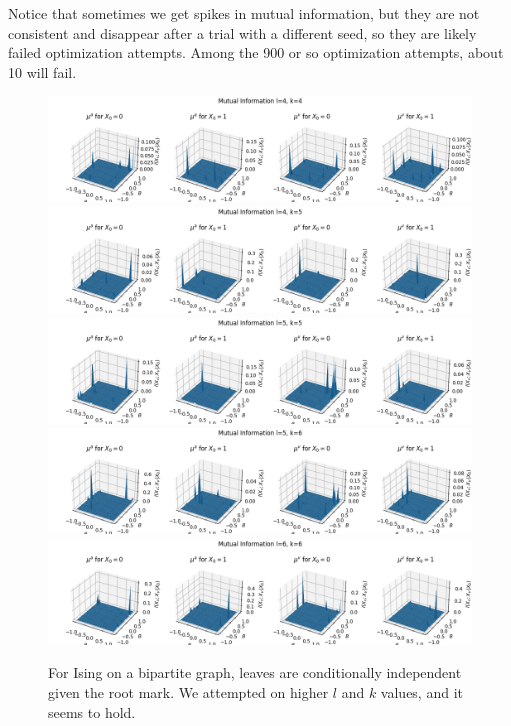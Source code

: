 \documentclass[12pt]{article}
\numberwithin{equation}{section}
\begin{document}
Notice that sometimes we get spikes in mutual information, but they are not
consistent and disappear after a trial with a different seed, so they are likely failed optimization attempts.
Among the 900 or so optimization attempts, about 10 will fail.

\begin{figure}[!h]
    \centering
    \includegraphics[width=16cm]{img/Ising_bptt/CI_l4_k4.png}
    \includegraphics[width=16cm]{img/Ising_bptt/CI_l4_k5.png}
    \includegraphics[width=16cm]{img/Ising_bptt/CI_l5_k5.png}
    \includegraphics[width=16cm]{img/Ising_bptt/CI_l5_k6.png}
    \includegraphics[width=16cm]{img/Ising_bptt/CI_l6_k6.png}
    \caption{For Ising on a bipartite graph, leaves are conditionally independent given the root mark. We attempted on higher $l$ and $k$ values, and it seems to hold.}
    \label{Eq.ISBP-CI-large-lk}
\end{figure}
\end{document}
